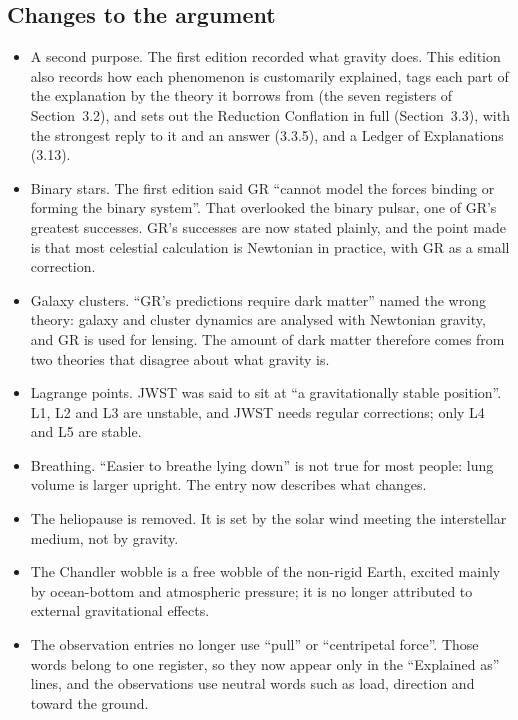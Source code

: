 \documentclass[11pt,a4paper]{article}
\begin{document}
\subsection*{Changes to the argument}
\begin{itemize}
  \item A second purpose. The first edition recorded what gravity does. This edition also records how each phenomenon is customarily explained, tags each part of the explanation by the theory it borrows from (the seven registers of Section~3.2), and sets out the Reduction Conflation in full (Section~3.3), with the strongest reply to it and an answer (3.3.5), and a Ledger of Explanations (3.13).
  \item Binary stars. The first edition said GR ``cannot model the forces binding or forming the binary system''. That overlooked the binary pulsar, one of GR's greatest successes. GR's successes are now stated plainly, and the point made is that most celestial calculation is Newtonian in practice, with GR as a small correction.
  \item Galaxy clusters. ``GR's predictions require dark matter'' named the wrong theory: galaxy and cluster dynamics are analysed with Newtonian gravity, and GR is used for lensing. The amount of dark matter therefore comes from two theories that disagree about what gravity is.
  \item Lagrange points. JWST was said to sit at ``a gravitationally stable position''. L1, L2 and L3 are unstable, and JWST needs regular corrections; only L4 and L5 are stable.
  \item Breathing. ``Easier to breathe lying down'' is not true for most people: lung volume is larger upright. The entry now describes what changes.
  \item The heliopause is removed. It is set by the solar wind meeting the interstellar medium, not by gravity.
  \item The Chandler wobble is a free wobble of the non-rigid Earth, excited mainly by ocean-bottom and atmospheric pressure; it is no longer attributed to external gravitational effects.
  \item The observation entries no longer use ``pull'' or ``centripetal force''. Those words belong to one register, so they now appear only in the ``Explained as'' lines, and the observations use neutral words such as load, direction and toward the ground.
\end{itemize}
\end{document}
